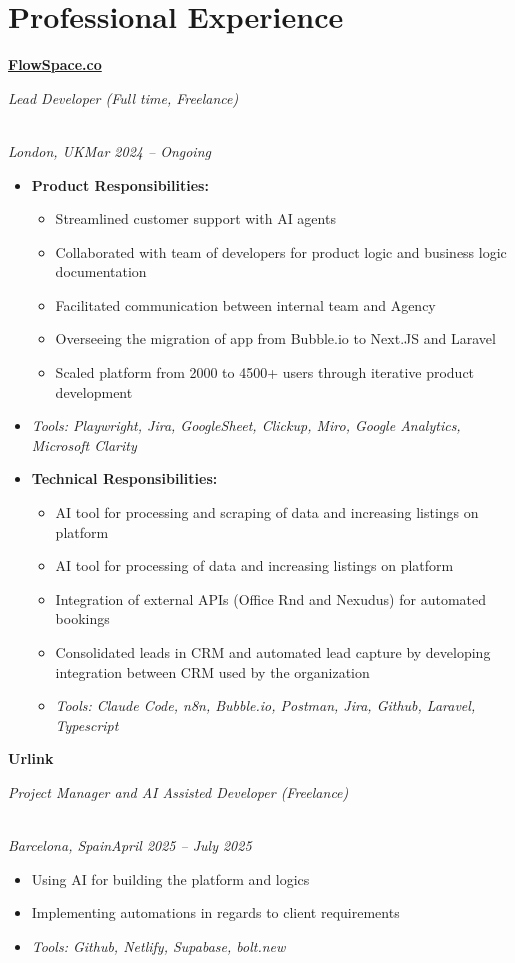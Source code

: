 \documentclass[a4paper,10pt]{article}
\newcommand{\role}[4]{\vspace{3pt}\noindent\hspace{0.6em}\parbox[t]{0.38\textwidth}{\raggedright\textbf{#1}}\hfill\parbox[t]{0.58\textwidth}{\raggedleft\textit{#2}}\\{\textit{#3}\hfill\textit{#4}}\vspace{1pt}}
\begin{document}
\section{Professional Experience}
\role{\href{https://flowspace.co}{FlowSpace.co}}{Lead Developer (Full time, Freelance)}{London, UK}{Mar 2024 -- Ongoing}
\begin{itemize}
\item \textbf{Product Responsibilities:}
\begin{itemize}[label=--]
\item Streamlined customer support with AI agents
\item Collaborated with team of developers for product logic and business logic documentation
\item Facilitated communication between internal team and Agency
\item Overseeing the migration of app from Bubble.io to Next.JS and Laravel
\item Scaled platform from 2000 to 4500+ users through iterative product development
\end{itemize}
\item \textit{Tools: Playwright, Jira, GoogleSheet, Clickup, Miro, Google Analytics, Microsoft Clarity}
\item \textbf{Technical Responsibilities:}
\begin{itemize}[label=--]
\item AI tool for processing and scraping of data and increasing listings on platform
\item AI tool for processing of data and increasing listings on platform
\item Integration of external APIs (Office Rnd and Nexudus) for automated bookings
\item Consolidated leads in CRM and automated lead capture by developing integration between CRM used by the organization
\item \textit{Tools: Claude Code, n8n, Bubble.io, Postman, Jira, Github, Laravel, Typescript}
\end{itemize}
\end{itemize}

\role{Urlink}{Project Manager and AI Assisted Developer (Freelance)}{Barcelona, Spain}{April 2025 -- July 2025}
\begin{itemize}
\item Using AI for building the platform and logics
\item Implementing automations in regards to client requirements
\item \textit{Tools: Github, Netlify, Supabase, bolt.new}
\end{itemize}
\end{document}
